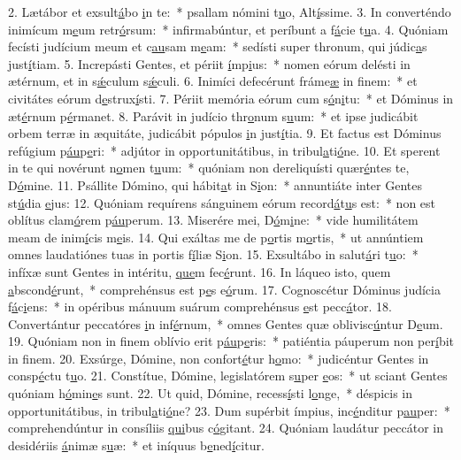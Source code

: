 2. Lætábor et exsult\uline{á}bo \uline{i}n te:~* psallam nómini t\uline{u}o, Alt\uline{í}ssime.
3. In converténdo inimícum m\uline{e}um retr\uline{ó}rsum:~* infirmabúntur, et períbunt a f\uline{á}cie t\uline{u}a.
4. Quóniam fecísti judícium meum et c\uline{au}sam m\uline{e}am:~* sedísti super thronum, qui júdic\uline{a}s just\uline{í}tiam.
5. Increpásti Gentes, et périit \uline{í}mp\uline{i}us:~* nomen eórum delésti in ætérnum, et in s\uline{ǽ}culum s\uline{ǽ}culi.
6. Inimíci defecérunt fráme\uline{æ} in f\uline{i}nem:~* et civitátes eórum d\uline{e}strux\uline{í}sti.
7. Périit memória eórum cum s\uline{ó}n\uline{i}tu:~* et Dóminus in æt\uline{é}rnum p\uline{é}rmanet.
8. Parávit in judício thr\uline{o}num s\uline{u}um:~* et ipse judicábit orbem terræ in æquitáte, judicábit pópulos \uline{i}n just\uline{í}tia.
9. Et factus est Dóminus refúgium p\uline{áu}p\uline{e}ri:~* adjútor in opportunitátibus, in tribul\uline{a}ti\uline{ó}ne.
10. Et sperent in te qui novérunt n\uline{o}men t\uline{u}um:~* quóniam non dereliquísti quær\uline{é}ntes te, D\uline{ó}mine.
11. Psállite Dómino, qui hábit\uline{a}t in S\uline{i}on:~* annuntiáte inter Gentes st\uline{ú}dia \uline{e}jus:
12. Quóniam requírens sánguinem eórum record\uline{á}t\uline{u}s est:~* non est oblítus clam\uline{ó}rem p\uline{áu}perum.
13. Miserére mei, D\uline{ó}m\uline{i}ne:~* vide humilitátem meam de inim\uline{í}cis m\uline{e}is.
14. Qui exáltas me de p\uline{o}rtis m\uline{o}rtis,~* ut annúntiem omnes laudatiónes tuas in portis f\uline{í}liæ S\uline{i}on.
15. Exsultábo in salut\uline{á}ri t\uline{u}o:~* infíxæ sunt Gentes in intéritu, \uline{que}m fec\uline{é}runt.
16. In láqueo isto, quem \uline{a}bscond\uline{é}runt,~* comprehénsus est p\uline{e}s e\uline{ó}rum.
17. Cognoscétur Dóminus judícia f\uline{á}c\uline{i}ens:~* in opéribus mánuum suárum comprehénsus \uline{e}st pecc\uline{á}tor.
18. Convertántur peccatóres \uline{i}n inf\uline{é}rnum,~* omnes Gentes quæ oblivisc\uline{ú}ntur D\uline{e}um.
19. Quóniam non in finem oblívio erit p\uline{áu}p\uline{e}ris:~* patiéntia páuperum non per\uline{í}bit in f\uline{i}nem.
20. Exsúrge, Dómine, non confort\uline{é}tur h\uline{o}mo:~* judicéntur Gentes in consp\uline{é}ctu t\uline{u}o.
21. Constítue, Dómine, legislatórem s\uline{u}per \uline{e}os:~* ut sciant Gentes quóniam h\uline{ó}min\uline{e}s sunt.
22. Ut quid, Dómine, recess\uline{í}sti l\uline{o}nge,~* déspicis in opportunitátibus, in tribul\uline{a}ti\uline{ó}ne?
23. Dum supérbit ímpius, inc\uline{é}nditur p\uline{au}per:~* comprehendúntur in consíliis \uline{qui}bus c\uline{ó}gitant.
24. Quóniam laudátur peccátor in desidériis \uline{á}nimæ s\uline{u}æ:~* et iníquus b\uline{e}ned\uline{í}citur.
